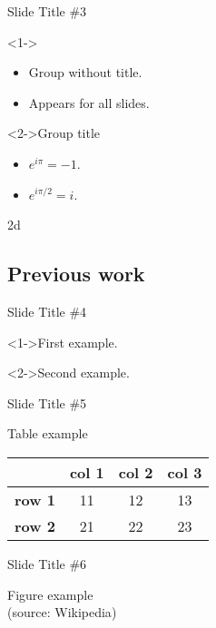 \documentclass{beamer}
\begin{document}
\begin{frame}{Slide Title \#3}
	\begin{block}
		<1->{}
		\begin{itemize}
			\item Group without title.
			\item Appears for all slides.
		\end{itemize}
	\end{block}
	\begin{exampleblock}
		<2->{Group title}
		\begin{itemize}
			\item $e^{i\pi}=-1$.
			\item $e^{i\pi/2}=i$.
		\end{itemize}
	\end{exampleblock}
\end{frame}

\begin{frame}
\gls{2d}
\end{frame}

\subsection{Previous work}

\begin{frame}{Slide Title \#4}
	\begin{example}
		<1->First example. 
	\end{example}
	\begin{example}
		<2->Second example.
	\end{example}
\end{frame}

\begin{frame}{Slide Title \#5}
	\begin{center}
		Table example \\[12pt]
		\begin{tabular}{c||c|c|c|}
			& \textbf{col 1} & \textbf{col  2} & \textbf{col 3} \\
			\hline
			\hline
			\textbf{row 1} & 11 & 12 & 13 \\
			\hline
			\textbf{row 2} & 21 & 22 & 23 \\
		\end{tabular}
    \end{center}
\end{frame}

\begin{frame}{Slide Title \#6}
	\begin{center}
		Figure example \\[12pt]
		\footnotesize(source: \textlatin{Wikipedia})
    \end{center}
\end{frame}
\end{document}
